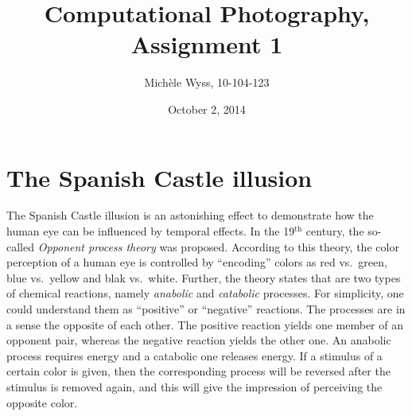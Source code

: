 \documentclass[a4paper]{article}
\title{Computational Photography, Assignment 1}
\author{Mich\`ele Wyss, 10-104-123}
\date{October 2, 2014}
\begin{document}
\maketitle
\section{The Spanish Castle illusion}
The Spanish Castle illusion is an astonishing effect to demonstrate how the human eye can be influenced by temporal effects.  In the 19$^{\text{th}}$ century, the so-called \emph{Opponent process theory} was proposed. According to this theory, the color perception of a human eye is controlled by ``encoding'' colors as red vs.\ green,  blue vs.\ yellow and blak vs.\ white. Further, the theory states that are two types of chemical reactions, namely \emph{anabolic} and \emph{catabolic} processes. For simplicity, one could understand them as ``positive'' or ``negative'' reactions. The processes are in a sense the opposite of each other. The positive reaction yields one member of an opponent pair, whereas the negative reaction yields the other one. An anabolic process requires energy and a catabolic one releases energy. If a stimulus of a certain color is given, then the corresponding process will be reversed after the stimulus is removed again, and this will give the impression of perceiving the opposite color.
\end{document}
